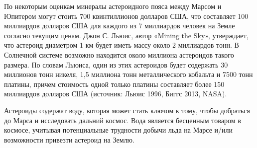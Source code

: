 По некоторым оценкам минералы астероидного пояса между Марсом и Юпитером могут стоить 700 квинтиллионов долларов США, что составляет 100 миллиардов долларов США для каждого из 7 миллиардов человек на Земле согласно текущим ценам. Джон С. Льюис, автор «Mining the Sky», утверждает, что астероид диаметром 1 км будет иметь массу около 2 миллиардов тонн. В Солнечной системе возможно находится около миллиона астероидов такого размера. По словам Льюиса, один из этих астероидов будет содержать 30 миллионов тонн никеля, 1,5 миллиона тонн металлического кобальта и 7500 тонн платины, причем стоимость одной только платины составляет более 150 миллиардов долларов США (источник: Льюис 1996, Биггс 2013, NASA).

Астероиды содержат воду, которая может стать ключом к тому, чтобы добраться до Марса и исследовать дальний космос. Вода является бесценным товаром в космосе, учитывая потенциальные трудности добычи льда на Марсе и/или возможности привезти астероид на Землю.